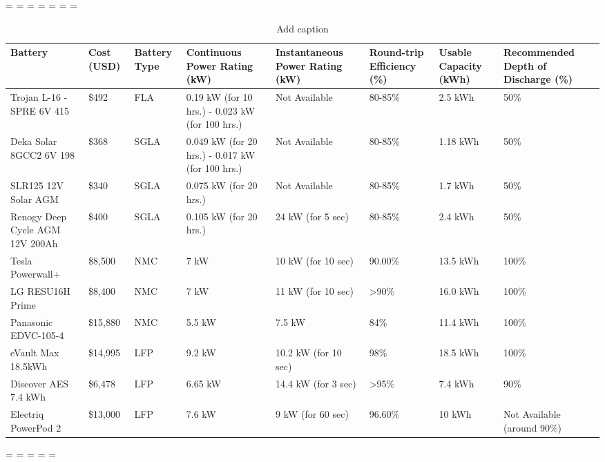 \paperwidth=\pdfpageheight
\paperheight=\pdfpagewidth
\pdfpageheight=\paperheight
\pdfpagewidth=\paperwidth
\headwidth=\textheight
\begingroup 
\vsize=\textwidth
\hsize=\textheight
\begin{table}[H]
  \centering
  \caption{Add caption}
    \begin{tabular}{|p{6.865em}|l|p{3.09em}|p{7.725em}|p{7.635em}|l|p{6.225em}|p{8.275em}|}
    \toprule
    \textbf{Battery} & \multicolumn{1}{p{3.32em}|}{\textbf{Cost (USD)}} & \textbf{Battery Type} & \textbf{Continuous Power Rating (kW)} & \textbf{Instantaneous Power Rating (kW)} & \multicolumn{1}{p{5.865em}|}{\textbf{Round-trip Efficiency (\%)}} & \textbf{Usable Capacity (kWh)} & \textbf{Recommended Depth of Discharge (\%)} \\
    \midrule
    Trojan L-16 -SPRE 6V 415 & \$492  & FLA   & 0.19 kW (for 10 hrs.) - 0.023 kW (for 100 hrs.) & Not Available & \multicolumn{1}{p{5.865em}|}{80-85\%} & 2.5 kWh & \multicolumn{1}{l|}{50\%} \\
    \midrule
    Deka Solar 8GCC2 6V 198 & \$368  & SGLA  & 0.049 kW (for 20 hrs.) - 0.017 kW (for 100 hrs.) & Not Available & \multicolumn{1}{p{5.865em}|}{80-85\%} & 1.18 kWh & \multicolumn{1}{l|}{50\%} \\
    \midrule
    SLR125 12V Solar AGM & \$340  & SGLA  & 0.075 kW (for 20 hrs.) & Not Available & \multicolumn{1}{p{5.865em}|}{80-85\%} & 1.7 kWh & \multicolumn{1}{l|}{50\%} \\
    \midrule
    Renogy Deep Cycle AGM 12V 200Ah & \$400  & SGLA  & 0.105 kW (for 20 hrs.) & 24 kW (for 5 sec) & \multicolumn{1}{p{5.865em}|}{80-85\%} & 2.4 kWh & \multicolumn{1}{l|}{50\%} \\
    \midrule
    Tesla Powerwall+ & \$8,500  & NMC   & 7 kW  & 10 kW (for 10 sec) & 90.00\% & 13.5 kWh & \multicolumn{1}{l|}{100\%} \\
    \midrule
    LG RESU16H Prime & \$8,400  & NMC   & 7 kW  & 11 kW (for 10 sec) & \multicolumn{1}{p{5.865em}|}{>90\%} & 16.0 kWh & \multicolumn{1}{l|}{100\%} \\
    \midrule
    Panasonic EDVC-105-4 & \$15,880  & NMC   & 5.5 kW & 7.5 kW & 84\%  & 11.4 kWh & \multicolumn{1}{l|}{100\%} \\
    \midrule
    eVault Max 18.5kWh & \$14,995  & LFP   & 9.2 kW & 10.2 kW (for 10 sec) & 98\%  & 18.5 kWh & \multicolumn{1}{l|}{100\%} \\
    \midrule
    Discover AES 7.4 kWh & \$6,478  & \multicolumn{1}{l|}{LFP} & \multicolumn{1}{l|}{6.65 kW} & \multicolumn{1}{l|}{14.4 kW (for 3 sec)} & >95\% & \multicolumn{1}{l|}{7.4 kWh} & \multicolumn{1}{l|}{90\%} \\
    \midrule
    Electriq PowerPod 2 & \$13,000  & LFP   & 7.6 kW & 9 kW (for 60 sec) & 96.60\% & 10 kWh & Not Available (around 90\%) \\
    \bottomrule
    \end{tabular}%
  \label{tab:tabl2}%
\end{table}%
\endgroup
\newpage
\paperwidth=\pdfpageheight
\paperheight=\pdfpagewidth
\pdfpageheight=\paperheight
\pdfpagewidth=\paperwidth
\headwidth=\textwidth